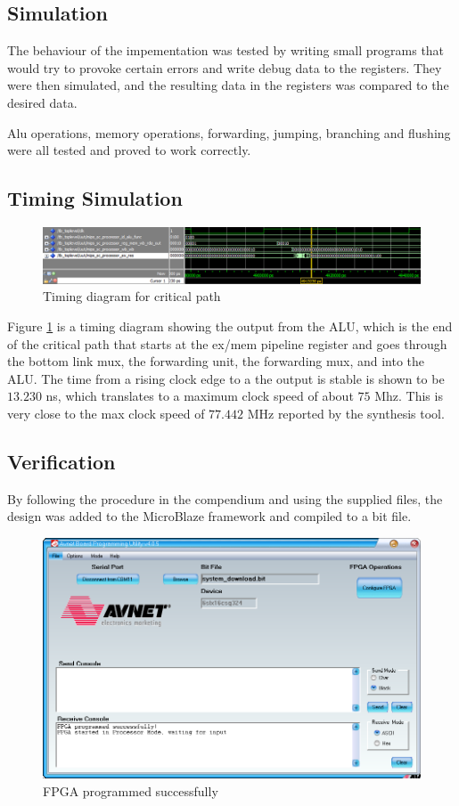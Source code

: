 \subsection{Simulation}

The behaviour of the impementation was tested by writing small programs that would try to provoke certain errors and write debug data to the registers. They were then simulated, and the resulting data in the registers was compared to the desired data.

Alu operations, memory operations, forwarding, jumping, branching and flushing were all tested and proved to work correctly.

\subsection{Timing Simulation}

\begin{figure}[ht]
    \centering
    \includegraphics[scale=0.5]{figures/TimingSimulation.png}
    \caption{Timing diagram for critical path} 
    \label{fig:timing}
\end{figure}

Figure \ref{fig:timing} is a timing diagram showing the output from the ALU, which is the end of the critical path that starts at the ex/mem pipeline register and goes through the bottom link mux, the forwarding unit, the forwarding mux, and into the ALU.
The time from a rising clock edge to a the output is stable is shown to be $13.230$ ns, which translates to a maximum clock speed of about $75$ Mhz.
This is very close to the max clock speed of $77.442$ MHz reported by the synthesis tool.

\subsection{Verification}

By following the procedure in the compendium \cite[p.47]{lab-compendium} and using the supplied files, the design was added to the MicroBlaze framework and compiled to a bit file.


\begin{figure}[ht]
    \centering
    \includegraphics[scale=0.5]{figures/AVNET.png}
    \caption{FPGA programmed successfully} 
    \label{fig:avprog}
\end{figure}


